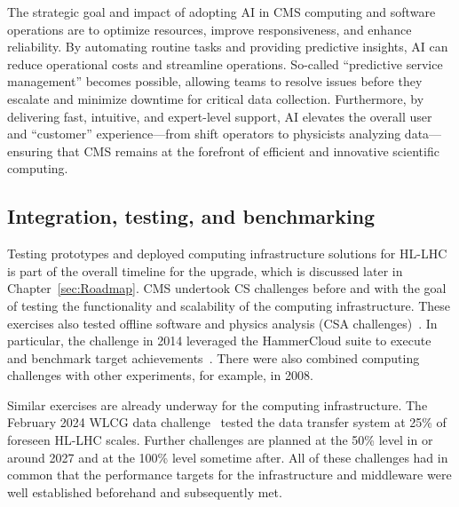 The strategic goal and impact of adopting \gls{AI} in CMS computing and software operations are to optimize resources, improve responsiveness, and enhance reliability. By automating routine tasks and providing predictive insights, \gls{AI} can reduce operational costs and streamline operations. So-called ``predictive service management'' becomes possible, allowing teams to resolve issues before they escalate and minimize downtime for critical data collection. Furthermore, by delivering fast, intuitive, and expert-level support, \gls{AI} elevates the overall user and ``customer'' experience---from shift operators to physicists analyzing data---ensuring that CMS remains at the forefront of efficient and innovative scientific computing.


\subsection{Integration, testing, and benchmarking}
\label{sec:infrastructure-challenges}

Testing prototypes and deployed computing infrastructure solutions for \gls{HL-LHC} is part of the overall timeline for the \PhaseTwo upgrade, which is discussed later in Chapter~\ref{sec:Roadmap}. CMS undertook \gls{CS} challenges before \RunOne and \RunTwo with the goal of testing the functionality and scalability of the computing infrastructure. These exercises also tested offline software and physics analysis (\gls{CSA} challenges)~\cite{CSA07}. In particular, the challenge in 2014 leveraged the HammerCloud suite to execute and benchmark target achievements~\cite{vanderSter:2011zz}. There were also combined computing challenges with other experiments, for example, in 2008.

Similar exercises are already underway for the computing infrastructure. The February 2024 \gls{WLCG} data challenge~\cite{lassnig_wissing_dc2024} tested the data transfer system at 25\% of foreseen \gls{HL-LHC} scales. Further challenges are planned at the 50\% level in or around 2027 and at the 100\% level sometime after. All of these challenges had in common that the performance targets for the infrastructure and middleware were well established beforehand and subsequently met.

